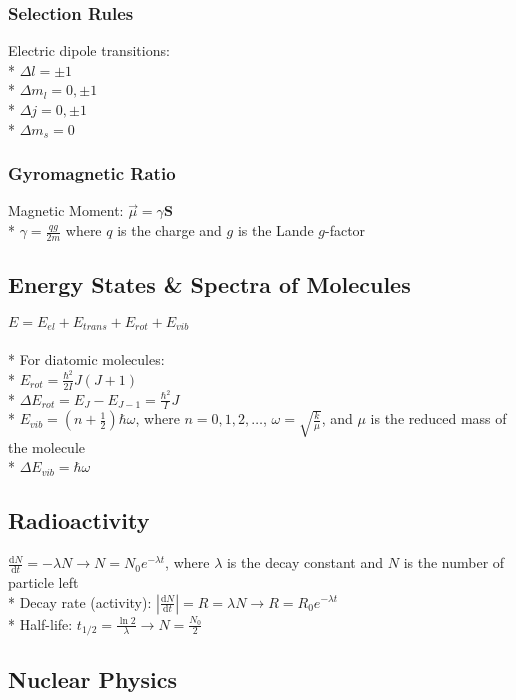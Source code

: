 \subsubsection{Selection Rules}
Electric dipole transitions:\\*
\(\Delta l=\pm1\)\\*
\(\Delta m_l=0,\pm1\)\\*
\(\Delta j=0,\pm1\)\\*
\(\Delta m_s=0\)

\subsubsection{Gyromagnetic Ratio}
Magnetic Moment: \(\vec{\mu}=\gamma\mathbf{S}\)\\*
\(\displaystyle\gamma = \frac{qg}{2m}\) where \(q\) is the charge and \(g\) is the Lande \(g\)-factor

\subsection{Energy States \& Spectra of Molecules}
\(E=E_{el}+E_{trans}+E_{rot}+E_{vib}\)\\\\*
For diatomic molecules:\\*
\(E_{rot}=\frac{\hbar^2}{2I}J(J+1)\)\\*
\(\Delta E_{rot}=E_J-E_{J-1}=\frac{\hbar^2}{I}J\)\\*
\(E_{vib}=(n+\frac{1}{2})\hbar\omega\), where \(n=0,1,2, \ldots\), \(\omega = \sqrt{\frac{k}{\mu}}\), and \(\mu\) is the reduced mass of the molecule\\*
\(\Delta E_{vib}=\hbar\omega\)

\subsection{Radioactivity}
\(\displaystyle \frac{\mathrm{d}N}{\mathrm{d}t}=-\lambda N\rightarrow N=N_0 e^{-\lambda t}\), where \(\lambda\) is the decay constant and \(N\) is the number of particle left\\*
Decay rate (activity): \(\displaystyle \left|\frac{\mathrm{d}N}{\mathrm{d}t}\right|=R=\lambda N\rightarrow R=R_0 e^{-\lambda t}\)\\*
Half-life: \(\displaystyle t_{1/2}=\frac{\ln{2}}{\lambda}\rightarrow N=\frac{N_0}{2}\)

\subsection{Nuclear Physics}

